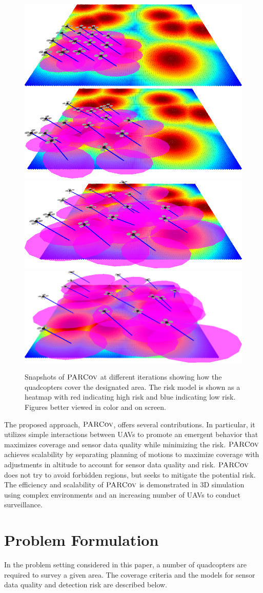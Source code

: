 \documentclass[letterpaper, 10pt, conference]{ieeeconf}
\newcommand{\Function}[1]{\ensuremath{{ \textsc{#1}}}}
\newcommand{\Name}{\Function{\small{PARCov}}}
\begin{document}
\begin{figure}
\includegraphics[width=0.49\columnwidth]{usef/rover1.png}
\includegraphics[width=0.49\columnwidth]{usef/rover2.png}\\
\includegraphics[width=0.49\columnwidth]{usef/rover3.png}
\includegraphics[width=0.49\columnwidth]{usef/rover4.png}
\caption{Snapshots of $\Name$ at different iterations showing how the
  quadcopters cover the designated area. The risk model is shown as a heatmap with red indicating high risk and blue indicating low risk. Figures better viewed in color and on screen.}
\label{fig:cover}
\end{figure}


The proposed approach, $\Name$, offers several contributions. In
particular, it utilizes simple interactions between UAVs to promote an
emergent behavior that maximizes coverage and sensor data quality
while minimizing the risk.  $\Name$ achieves scalability by separating
planning of motions to maximize coverage with adjustments in altitude
to account for sensor data quality and risk. $\Name$ does not try to
avoid forbidden regions, but seeks to mitigate the potential risk. The
efficiency and scalability of $\Name$ is demonstrated in 3D simulation
using complex environments and an increasing number of UAVs to conduct
surveillance.


\section{Problem Formulation}
\label{sec:Problem}
In the problem setting considered in this paper, a number of
quadcopters  are required to survey a given area. The
coverage criteria and the models for  sensor data quality and
detection risk are described below.
\end{document}
